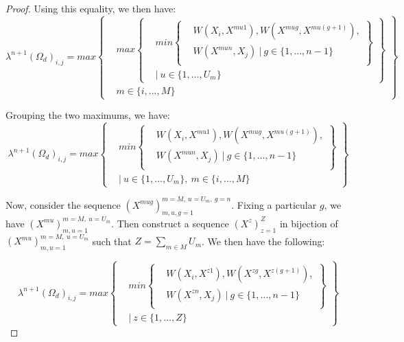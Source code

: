 \documentclass{article} %
\begin{document}
\begin{proof}
Using this equality, we then have:
\[
\lambda^{n+1}(\Omega_d)_{i,j} =max
\left\{
  \begin{aligned}
  &max
          \left\{
          \begin{aligned}
            &min\left\{
            \begin{aligned}
            &W(X_i,X^{mu1}), W(X^{mug},X^{mu(g+1)}), \\
            &W(X^{mun},X_j)\ |\ g\in\{1,\ldots,n-1\}\\
            \end{aligned}
            \right\} \\
            &|\ u\in\{1,\ldots,U_m\}
          \end{aligned}
          \right\} \\
  & m\in\{i,\ldots,M\}
  \end{aligned}
\right\}
\]

Grouping the two maximums, we have:
\[
\lambda^{n+1}(\Omega_d)_{i,j} =max
\left\{
  \begin{aligned}
            &min\left\{
            \begin{aligned}
            &W(X_i,X^{mu1}), W(X^{mug},X^{mu(g+1)}), \\
            &W(X^{mun},X_j)\ |\ g\in\{1,\ldots,n-1\}\\
            \end{aligned}
            \right\} \\
            &|\ u\in\{1,\ldots,U_m\},\ m\in\{i,\ldots,M\}
  \end{aligned}
\right\}
\]

Now, consider the sequence $(X^{mug})_{m,u,g=1}^{m=M,\ u=U_m,\ g=n}$. Fixing a particular $g$, we have $(X^{mu})_{m,u=1}^{m=M,\ u=U_m}$. Then construct a sequence $(X^z)_{z=1}^Z$ in bijection of $(X^{mu})_{m,u=1}^{m=M,\ u=U_m}$ such that $Z=\sum_{m\in M}U_m$. We then have the following: 

\[
\lambda^{n+1}(\Omega_d)_{i,j} =max
\left\{
  \begin{aligned}
            &min\left\{
            \begin{aligned}
            &W(X_i,X^{z1}), W(X^{zg},X^{z(g+1)}), \\
            &W(X^{zn},X_j)\ |\ g\in\{1,\ldots,n-1\}\\
            \end{aligned}
            \right\} \\
            &|\ z\in\{1,\ldots,Z\}
  \end{aligned}
\right\}
\]


\end{proof}
\end{document}

